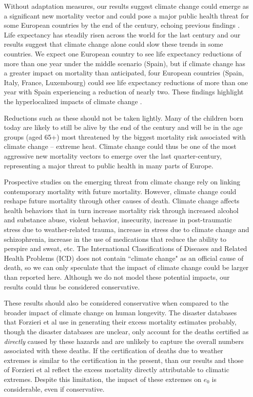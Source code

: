 \documentclass[12pt]{article}
\begin{document}
Without adaptation measures, our results suggest climate change could
emerge as a significant new mortality vector and could pose a major
public health threat for some European countries by the end of the
century, echoing previous findings
\citep{forzieri2017increasing, patz2005impact}. Life expectancy has
steadily risen across the world for the last century
\citep{gerland2014world} and our results suggest that climate change
alone could slow these trends in some countries. We expect one European
country to see life expectancy reductions of more than one year under
the middle scenario (Spain), but if climate change has a greater impact
on mortality than anticipated, four European countries (Spain, Italy,
France, Luxembourg) could see life expectancy reductions of more than
one year with Spain experiencing a reduction of nearly two. These
findings highlight the hyperlocalized impacts of climate change
\citep{kendon2014heavier, rosenzweig2010cities, forzieri2017increasing}.

Reductions such as these should not be taken lightly. Many of the
children born today are likely to still be alive by the end of the
century and will be in the age groups (aged 65+) most threatened by the
biggest mortality risk associated with climate change
\citep{keatinge2000heat} -- extreme heat. Climate change could thus be
one of the most aggressive new mortality vectors to emerge over the last
quarter-century, representing a major threat to public health in many
parts of Europe.

Prospective studies on the emerging threat from climate change rely on
linking contemporary mortality with future mortality. However, climate
change could reshape future mortality through other causes of death.
Climate change affects health behaviors that in turn increase mortality
risk through increased alcohol and substance abuse, violent behavior,
insecurity, increase in post-traumatic stress due to weather-related
trauma, increase in stress due to climate change and schizophrenia,
increase in the use of medications that reduce the ability to perspire
and sweat, etc. \citep{patz2005impact} The International Classifications
of Diseases and Related Health Problems (ICD) does not contain ``climate
change" as an official cause of death, so we can only speculate that the
impact of climate change could be larger than reported here. Although we
do not model these potential impacts, our results could thus be
considered conservative.

These results should also be considered conservative when compared to
the broader impact of climate change on human longevity. The disaster
databases that Forzieri et al \citep{forzieri2017increasing} use in
generating their excess mortality estimates probably, though the
disaster databases are unclear, only account for the deaths certified as
\emph{directly} caused by these hazards and are unlikely to capture the
overall numbers associated with these deaths. If the certification of
deaths due to weather extremes is similar to the certification in the
present, than our results and those of Forzieri et al reflect the excess
mortality directly attributable to climatic extremes. Despite this
limitation, the impact of these extremes on \(e_0\) is considerable,
even if conservative.
\end{document}
